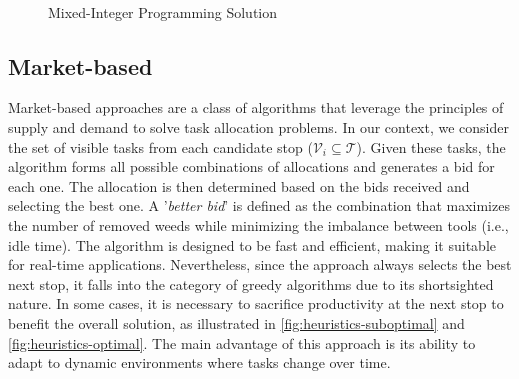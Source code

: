 \begin{figure}[htb]
    \myfloatalign
     \quad
     \\
    \caption{Mixed-Integer Programming Solution}\label{fig:mip-solution}
\end{figure}

\subsection{Market-based}
Market-based approaches are a class of algorithms that leverage the principles of supply and demand to solve task allocation problems. In our context, we consider the set of visible tasks from each candidate stop ($\mathcal{V}_i \subseteq \mathcal{T}$). Given these tasks, the algorithm forms all possible combinations of allocations and generates a bid for each one. The allocation is then determined based on the bids received and selecting the best one. A '\textit{better bid}' is defined as the combination that maximizes the number of removed weeds while minimizing the imbalance between tools (i.e., idle time). The algorithm is designed to be fast and efficient, making it suitable for real-time applications. Nevertheless, since the approach always selects the best next stop, it falls into the category of greedy algorithms due to its shortsighted nature. In some cases, it is necessary to sacrifice productivity at the next stop to benefit the overall solution, as illustrated in \autoref{fig:heuristics-suboptimal} and \autoref{fig:heuristics-optimal}. The main advantage of this approach is its ability to adapt to dynamic environments where tasks change over time.

